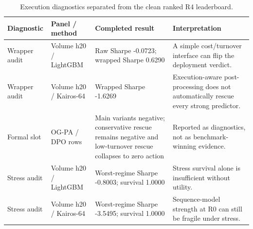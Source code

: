 \begin{table}[t]
\centering
\caption{Execution diagnostics separated from the clean ranked R4 leaderboard.}
\label{tab:table_04_execution_diagnostics}
\begin{tabular}{llll}
\toprule
Diagnostic & Panel / method & Completed result & Interpretation \\
\midrule
Wrapper audit & Volume h20 / LightGBM & Raw Sharpe -0.0723; wrapped Sharpe 0.6290 & A simple cost/turnover interface can flip the deployment verdict. \\
Wrapper audit & Volume h20 / Kairos-64 & Wrapped Sharpe -1.6269 & Execution-aware post-processing does not automatically rescue every strong predictor. \\
Formal slot & OG-PA / DPO rows & Main variants negative; conservative rescue remains negative and low-turnover rescue collapses to zero action & Reported as diagnostics, not as benchmark-winning evidence. \\
Stress audit & Volume h20 / LightGBM & Worst-regime Sharpe -0.8003; survival 1.0000 & Stress survival alone is insufficient without utility. \\
Stress audit & Volume h20 / Kairos-64 & Worst-regime Sharpe -3.5495; survival 1.0000 & Sequence-model strength at R0 can still be fragile under stress. \\
\bottomrule
\end{tabular}
\end{table}
